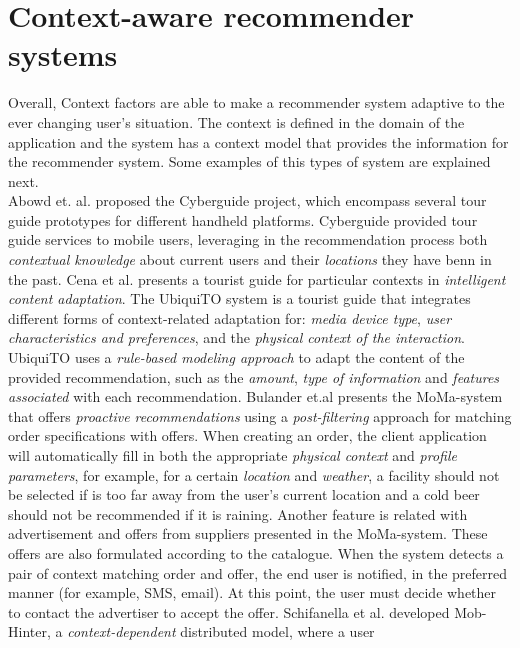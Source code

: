 \section{Context-aware recommender systems} 
Overall, Context factors are able to make a recommender system 
adaptive to the ever changing user's situation. The
context is defined in the domain of the application and the system has
a context model that provides the information for the recommender
system. Some  examples of this types of system are explained
next. \\
Abowd et. al. \cite{abowd1997cyberguide} proposed the
Cyberguide project, which encompass several tour 
guide prototypes for different handheld platforms. 
Cyberguide provided tour guide services to mobile users,
leveraging in the recommendation process both 
\textit{contextual knowledge} about current users and their 
\textit{locations} they have benn in the past. 
Cena et al. \cite{cena2006integrating} presents a tourist guide for particular 
contexts in \textit{intelligent content adaptation}. The UbiquiTO system is a
tourist guide that integrates different forms of context-related
adaptation for: \textit{media device type}, \textit{user characteristics and
preferences}, and the \textit{physical context of the interaction}. UbiquiTO uses
a \textit{rule-based modeling approach} to adapt the content of the provided
recommendation, such as the \textit{amount}, \textit{type of information} and 
\textit{features associated} with each recommendation. 
Bulander et.al \cite{bulander2005comparison} presents the MoMa-system 
that offers \textit{proactive recommendations} using a \textit{post-filtering} 
approach for matching order specifications with offers. 
When creating an order, the client application will automatically fill in both the 
appropriate \textit{physical context} and \textit{profile parameters}, for example, 
for a certain \textit{location} and \textit{weather}, a facility should not be selected
if is too far away from the user's current location and a cold beer should not be
recommended if it is raining. Another feature is related with 
advertisement and offers from suppliers presented in the MoMa-system. These offers are also
formulated according to the catalogue. When the system detects a pair
of context matching order and offer, the end user is notified, in the
preferred manner (for example, SMS, email). At this point, the user
must decide whether to contact the advertiser to accept the offer.
Schifanella et al. \cite{schifanella2008mobhinter} developed
Mob-Hinter, a \textit{context-dependent} distributed model, where a user 
